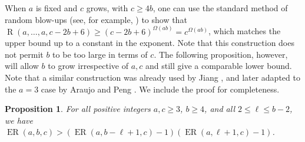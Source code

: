 \documentclass[10pt,a4paper]{article}
\theoremstyle{plain}
\newtheorem{proposition}[theorem]{Proposition}
\theoremstyle{definition}
\newcommand{\offerado}[3]{\operatorname{ER}(#1,#2,#3)}
\begin{document}
When $a$ is fixed and $c$ grows, with $c\ge 4b$, one can use the standard method of random blow-ups (see, for example, \cite{wigderson2021improved}) to show that $\operatorname{R}(a,\dots,a,c-2b+6)\ge (c-2b+6)^{\Omega(ab)}=c^{\Omega(ab)}$, which matches the upper bound up to a constant in the exponent. Note that this construction does not permit $b$ to be too large in terms of $c$. The following proposition, however, will allow $b$ to grow irrespective of $a,c$ and still give a comparable lower bound. Note that a similar construction was already used by Jiang \cite{jiang2009canonical}, and later adapted to the $a=3$ case by Araujo and Peng \cite{araujo2024off}. We include the proof for completeness.

\begin{proposition}\label{prop-lower-offerado-blowup}
    For all positive integers $a,c\ge 3$, $b\ge4$, and all $2\le \ell\le b-2$, we have $\offerado abc> (\offerado{a}{b-\ell+1}{c}-1)(\offerado{a}{\ell+1}{c}-1)$.
\end{proposition}
\end{document}
